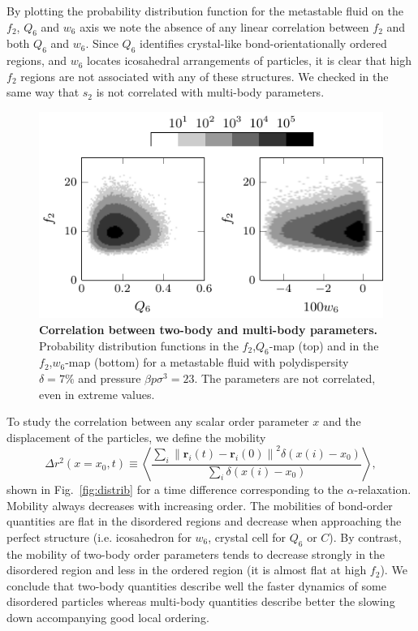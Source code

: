 \documentclass[twocolumn,superscriptaddress]{revtex4-1}
\begin{document}
By plotting the probability distribution function for the metastable fluid on the $f_2$, $Q_6$ and $w_6$ axis we note the absence of any linear correlation between $f_2$ and both $Q_6$ and $w_6$. Since $Q_6$ identifies crystal-like bond-orientationally ordered regions, and $w_6$ locates icosahedral arrangements of particles, it is clear that high $f_2$ regions are not associated with any of these structures. We checked in the same way that $s_2$ is not correlated with multi-body parameters.

\begin{figure}
 \centering
 \includegraphics{fig_f2decoupling}
 \caption{\textbf{Correlation between two-body and multi-body parameters.} Probability distribution functions in the $f_2$,$Q_6$-map (top) and in the $f_2$,$w_6$-map (bottom) for a metastable fluid with polydispersity $\delta=7\%$ and pressure $\beta p\sigma^3=23$. The parameters are not correlated, even in extreme values.}
 \label{fig:f2decoupling}
\end{figure}

To study the correlation between any scalar order parameter $x$ and the displacement of the particles, we define the mobility 
\begin{equation}
	\Delta r^2(x=x_0, t) \equiv \left\langle \frac{
		\sum\limits_i{
			\left\|\mathbf{r}_i(t)-\mathbf{r}_i(0)\right\|^2 \delta(x(i)-x_0)
			}
	}{
		\sum\limits_i{\delta(x(i)-x_0)}
	}\right\rangle,
	\label{eq:mobility}
\end{equation}
shown in Fig.~\ref{fig:distrib} for a time difference corresponding to the $\alpha$-relaxation. Mobility always decreases with increasing order. The mobilities of bond-order quantities are flat in the disordered regions and decrease when approaching the perfect structure (i.e. icosahedron for $w_6$, crystal cell for $Q_6$ or $C$). By contrast, the mobility of two-body order parameters tends to decrease strongly in the disordered region and less in the ordered region (it is almost flat at high $f_2$). We conclude that two-body quantities describe well the faster dynamics of some disordered particles whereas multi-body quantities describe better the slowing down accompanying good local ordering.
\end{document}
